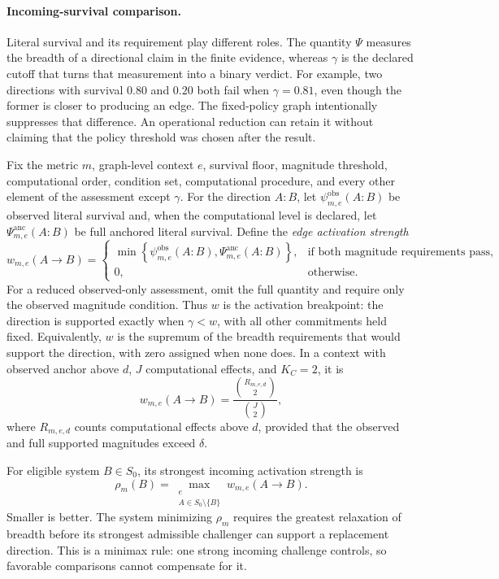 \documentclass[11pt]{article}
\theoremstyle{remark}
\begin{document}
\paragraph{Incoming-survival comparison.}
Literal survival and its requirement play different roles. The quantity
$\Psi$ measures the breadth of a directional claim in the finite evidence,
whereas $\gamma$ is the declared cutoff that turns that measurement into a
binary verdict. For example, two directions with survival $0.80$ and $0.20$
both fail when $\gamma=0.81$, even though the former is closer to producing an
edge. The fixed-policy graph intentionally suppresses that difference. An
operational reduction can retain it without claiming that the policy threshold
was chosen after the result.

Fix the metric $m$, graph-level context $e$, survival floor, magnitude
threshold, computational order, condition set, computational procedure, and every
other element of the assessment except $\gamma$. For the direction $A:B$, let
$\psi^{\mathrm{obs}}_{m,e}(A:B)$ be observed literal survival and, when the
computational level is declared, let
$\Psi^{\mathrm{anc}}_{m,e}(A:B)$ be full anchored literal survival. Define the
\emph{edge activation strength}
\begin{equation}
w_{m,e}(A\to B)
=
\begin{cases}
\min\!\left\{
\psi^{\mathrm{obs}}_{m,e}(A:B),
\Psi^{\mathrm{anc}}_{m,e}(A:B)
\right\},
& \text{if both magnitude requirements pass},\\
0, & \text{otherwise}.
\end{cases}
\label{eq:edge-activation-strength}
\end{equation}
For a reduced observed-only assessment, omit the full quantity and require
only the observed magnitude condition. Thus $w$ is the activation breakpoint:
the direction is supported exactly when $\gamma<w$, with all other
commitments held fixed. Equivalently, $w$ is the supremum of the breadth
requirements that would support the direction, with zero assigned when none
does. In a context with observed anchor above $d$, $J$ computational effects, and
$K_C=2$, it is
\[
w_{m,e}(A\to B)
=
\frac{\binom{R_{m,e,d}}{2}}{\binom{J}{2}},
\]
where $R_{m,e,d}$ counts computational effects above $d$, provided that the
observed and full supported magnitudes exceed $\delta$.

For eligible system $B\in S_0$, its strongest incoming activation strength is
\begin{equation}
\rho_m(B)
=
\max_{\substack{e\\A\in S_0\setminus\{B\}}}
w_{m,e}(A\to B).
\label{eq:incoming-survival-minimax}
\end{equation}
Smaller is better. The system minimizing $\rho_m$ requires the greatest
relaxation of breadth before its strongest admissible challenger can support a
replacement direction. This is a minimax rule: one strong incoming challenge
controls, so favorable comparisons cannot compensate for it.
\end{document}
